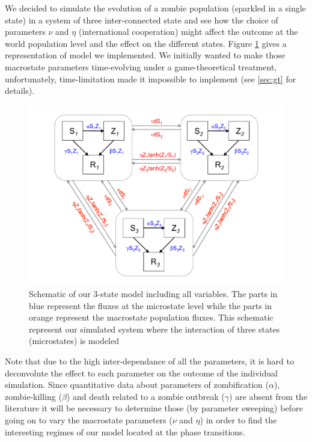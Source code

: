 \documentclass[11pt]{article} %
\begin{document}
We decided to simulate the evolution of a zombie population (sparkled in a single state) in a system of three inter-connected state and see how the choice of parameters $\nu$ and $\eta$ (international cooperation) might affect the outcome at the world population level and the effect on the different states. Figure \ref{totalmodel} gives a representation of model we implemented. We initially wanted to make those macrostate parameters time-evolving under a game-theoretical treatment, unfortunately, time-limitation made it impossible to implement (see \ref{sec:gt} for details). 
\begin{figure}[h!]
\centerline{
\includegraphics[scale=0.45]{../images/Powerpoint_figures/total_model.pdf}}
\caption{Schematic of our 3-state model including all variables. The parts in blue represent the fluxes at the microstate level while the parts in orange represent the macrostate population fluxes. This schematic represent our simulated system where the interaction of three states (microstates) is modeled \label{totalmodel} }
\end{figure}


Note that due to the high inter-dependance of all the parameters, it is hard to deconvolute the effect to each parameter on the outcome of the individual simulation. Since quantitative data about parameters of zombification ($\alpha$), zombie-killing ($\beta$) and death related to a zombie outbreak ($\gamma$) are absent from the literature it will be necessary to determine those (by parameter sweeping) before going on to vary the macrostate parameters ($\nu$ and $\eta$) in order to find the interesting regimes of our model located at the phase transitions. 
\end{document}
